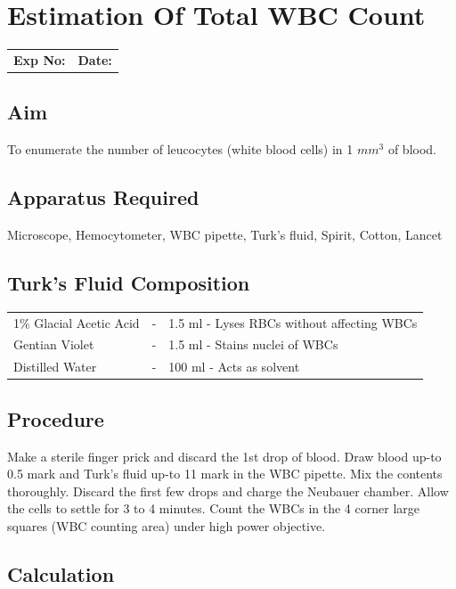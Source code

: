 \documentclass[a4paper,12pt]{book}
\begin{document}
					\chapter*{\centering Estimation Of Total WBC Count}

					\begin{tabular}{p{5in} p{1in}}
						\textbf{Exp No:}  & \textbf{Date:}\\
					\end{tabular}
					\section *{Aim}
					To enumerate the number of leucocytes (white blood cells) in 1 $mm^3$ of blood.
					\section*{Apparatus Required}
					Microscope, Hemocytometer, WBC pipette, Turk’s fluid, Spirit, Cotton, Lancet
					\section*{Turk's Fluid Composition}
					\begin{tabular}{l c l}

						1\% Glacial Acetic Acid	&	-&	1.5 ml - Lyses RBCs without affecting WBCs\\
						Gentian Violet&			-&	1.5 ml - Stains nuclei of WBCs\\
						Distilled Water&		-&	100 ml - Acts as solvent\\

					\end{tabular}
					\section*{Procedure}

					Make a sterile finger prick and discard the 1st drop of blood. Draw blood up-to 0.5 mark and Turk’s fluid up-to 11 mark in the WBC pipette. Mix the contents thoroughly. Discard the first few drops and charge the Neubauer chamber. Allow the cells to settle for 3 to 4 minutes. Count the WBCs in the 4 corner large squares (WBC counting area) under high power objective.

					\section*{Calculation}
\end{document}
